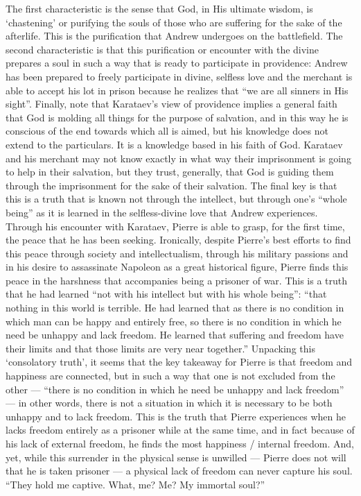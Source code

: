 The first characteristic is the sense that God, in His ultimate wisdom, is ‘chastening’ or purifying the souls of those who are suffering for the sake of the afterlife. This is the purification that Andrew undergoes on the battlefield. The second characteristic is that this purification or encounter with the divine prepares a soul in such a way that is ready to participate in providence: Andrew has been prepared to freely participate in divine, selfless love and the merchant is able to accept his lot in prison because he realizes that “we are all sinners in His sight”. Finally, note that Karataev’s view of providence implies a general faith that God is molding all things for the purpose of salvation, and in this way he is conscious of the end towards which all is aimed, but his knowledge does not extend to the particulars. It is a knowledge based in his faith of God. Karataev and his merchant may not know exactly in what way their imprisonment is going to help in their salvation, but they trust, generally, that God is guiding them through the imprisonment for the sake of their salvation. The final key is that this is a truth that is known not through the intellect, but through one’s “whole being” as it is learned in the selfless-divine love that Andrew experiences.
	Through his encounter with Karataev, Pierre is able to grasp, for the first time, the peace that he has been seeking. Ironically, despite Pierre’s best efforts to find this peace through society and intellectualism, through his military passions and in his desire to assassinate Napoleon as a great historical figure, Pierre finds this peace in the harshness that accompanies being a prisoner of war. This is a truth that he had learned “not with his intellect but with his whole being”: “that nothing in this world is terrible. He had learned that as there is no condition in which man can be happy and entirely free, so there is no condition in which he need be unhappy and lack freedom. He learned that suffering and freedom have their limits and that those limits are very near together.” 
Unpacking this ‘consolatory truth’, it seems that the key takeaway for Pierre is that freedom and happiness are connected, but in such a way that one is not excluded from the other — “there is no condition in which he need be unhappy and lack freedom” — in other words, there is not a situation in which it is necessary to be both unhappy and to lack freedom. This is the truth that Pierre experiences when he lacks freedom entirely as a prisoner while at the same time, and in fact because of his lack of external freedom, he finds the most happiness / internal freedom. And, yet, while this surrender in the physical sense is unwilled — Pierre does not will that he is taken prisoner — a physical lack of freedom can never capture his soul. “They hold me captive. What, me?  Me?  My immortal soul?”  
